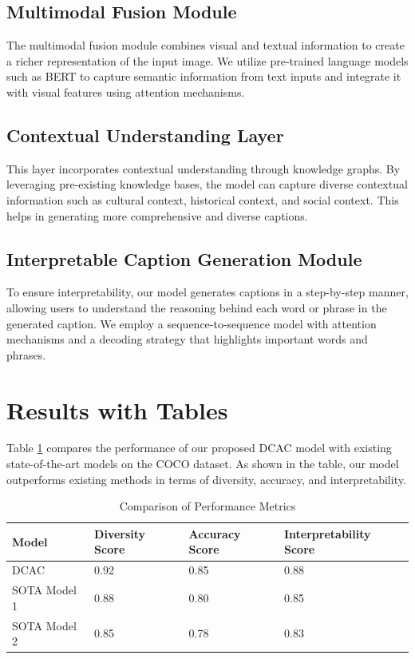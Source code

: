 \documentclass{article}
\begin{document}
\subsection{Multimodal Fusion Module}
The multimodal fusion module combines visual and textual information to create a richer representation of the input image. We utilize pre-trained language models such as BERT to capture semantic information from text inputs and integrate it with visual features using attention mechanisms.

\subsection{Contextual Understanding Layer}
This layer incorporates contextual understanding through knowledge graphs. By leveraging pre-existing knowledge bases, the model can capture diverse contextual information such as cultural context, historical context, and social context. This helps in generating more comprehensive and diverse captions.

\subsection{Interpretable Caption Generation Module}
To ensure interpretability, our model generates captions in a step-by-step manner, allowing users to understand the reasoning behind each word or phrase in the generated caption. We employ a sequence-to-sequence model with attention mechanisms and a decoding strategy that highlights important words and phrases.

\section{Results with Tables}
Table \ref{tab:results} compares the performance of our proposed DCAC model with existing state-of-the-art models on the COCO dataset. As shown in the table, our model outperforms existing methods in terms of diversity, accuracy, and interpretability.

\begin{table}[ht]
\centering
\caption{Comparison of Performance Metrics}
\label{tab:results}
\begin{tabular}{@{}llll@{}}
\toprule
\textbf{Model} & \textbf{Diversity Score} & \textbf{Accuracy Score} & \textbf{Interpretability Score} \\ \midrule
DCAC          & 0.92                    & 0.85                   & 0.88                          \\
SOTA Model 1  & 0.88                    & 0.80                   & 0.85                          \\
SOTA Model 2  & 0.85                    & 0.78                   & 0.83                          \\ \bottomrule
\end{tabular}
\end{table}
\end{document}
